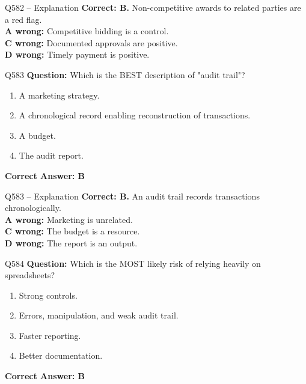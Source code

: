 \documentclass[aspectratio=169,10pt]{beamer}
\begin{document}
	\begin{frame}[t]{Q582 -- Explanation}
		\small
		\textbf{Correct: B.} Non-competitive awards to related parties are a red flag. \\[4pt]
		\textbf{A wrong:} Competitive bidding is a control. \\[2pt]
		\textbf{C wrong:} Documented approvals are positive. \\[2pt]
		\textbf{D wrong:} Timely payment is positive.
	\end{frame}
	
	\begin{frame}[t]{Q583}
		\small
		\textbf{Question:} Which is the BEST description of "audit trail"?
		\begin{enumerate}[label=\Alph*.,itemsep=1pt,topsep=2pt]
			\item A marketing strategy.
			\item A chronological record enabling reconstruction of transactions.
			\item A budget.
			\item The audit report.
		\end{enumerate}
		\vspace{4pt}
		\textbf{Correct Answer: B}
	\end{frame}
	
	\begin{frame}[t]{Q583 -- Explanation}
		\small
		\textbf{Correct: B.} An audit trail records transactions chronologically. \\[4pt]
		\textbf{A wrong:} Marketing is unrelated. \\[2pt]
		\textbf{C wrong:} The budget is a resource. \\[2pt]
		\textbf{D wrong:} The report is an output.
	\end{frame}
	
	\begin{frame}[t]{Q584}
		\small
		\textbf{Question:} Which is the MOST likely risk of relying heavily on spreadsheets?
		\begin{enumerate}[label=\Alph*.,itemsep=1pt,topsep=2pt]
			\item Strong controls.
			\item Errors, manipulation, and weak audit trail.
			\item Faster reporting.
			\item Better documentation.
		\end{enumerate}
		\vspace{4pt}
		\textbf{Correct Answer: B}
	\end{frame}
	
\end{document}
